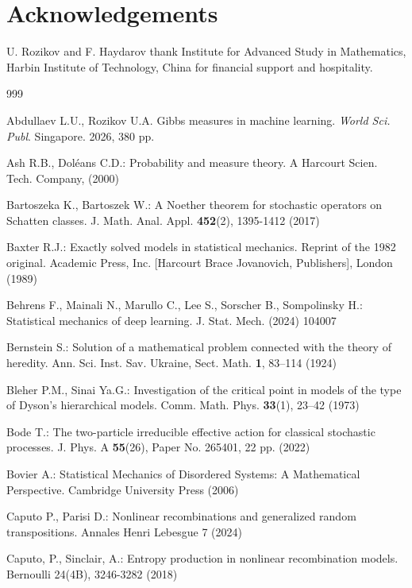 \documentclass[11pt,reqno]{amsart}
\numberwithin{equation}{section} \setcounter{tocdepth}{1}
\begin{document}
\section*{ Acknowledgements}
 U. Rozikov and F. Haydarov thank Institute for Advanced Study in Mathematics,
Harbin Institute of Technology,  China for financial support and hospitality.

\begin{thebibliography}{999}
	
	 Abdullaev L.U., Rozikov U.A. Gibbs measures in machine learning. {\sl World Sci. Publ}. Singapore. 2026, 380 pp.
	
  Ash R.B., Dol\'{e}ans C.D.: Probability and measure theory.
    A Harcourt Scien. Tech. Company, (2000)
    
   Bartoszeka K.,  Bartoszek W.: A Noether theorem for stochastic 
    operators on Schatten classes. J. Math. Anal. Appl. \textbf{452}(2), 1395-1412 (2017)

 Baxter R.J.: Exactly solved models in statistical mechanics. 
Reprint of the 1982 original. Academic Press, Inc. [Harcourt Brace Jovanovich, Publishers], London (1989)

 Behrens F., Mainali N., Marullo C., Lee S., Sorscher B., Sompolinsky H.: Statistical mechanics of deep learning. 
J. Stat. Mech. (2024) 104007

 Bernstein S.: Solution of a mathematical problem connected with the theory of heredity. 
Ann. Sci. Inst. Sav. Ukraine, Sect. Math. \textbf{1}, 83--114 (1924)

 Bleher P.M., Sinai Ya.G.: Investigation of the critical point in models of the type of Dyson's hierarchical models. 
Comm. Math. Phys. \textbf{33}(1), 23--42 (1973)

 Bode T.: The two-particle irreducible effective action for classical stochastic processes. 
J. Phys. A \textbf{55}(26), Paper No. 265401, 22 pp. (2022)

 Bovier A.: Statistical Mechanics of Disordered Systems: A Mathematical Perspective. 
Cambridge University Press (2006)

 Caputo P., Parisi D.: Nonlinear recombinations and generalized random transpositions. Annales Henri Lebesgue 7 (2024)


 Caputo, P., Sinclair, A.: Entropy production in nonlinear recombination models. Bernoulli 24(4B), 3246-3282 (2018)


\end{thebibliography}
\end{document}
